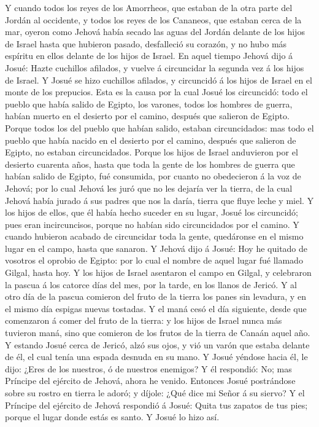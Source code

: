  Y cuando todos los reyes de los Amorrheos, que estaban de
la otra parte del Jordán al occidente, y todos los reyes de los
Cananeos, que estaban cerca de la mar, oyeron como Jehová había secado
las aguas del Jordán delante de los hijos de Israel hasta que hubieron
pasado, desfalleció su corazón, y no hubo más espíritu en ellos delante
de los hijos de Israel.  En aquel tiempo Jehová dijo á
Josué: Hazte cuchillos afilados, y vuelve á circuncidar la segunda vez á
los hijos de Israel.  Y Josué se hizo cuchillos afilados, y
circuncidó á los hijos de Israel en el monte de los prepucios.
 Esta es la causa por la cual Josué los circuncidó: todo el
pueblo que había salido de Egipto, los varones, todos los hombres de
guerra, habían muerto en el desierto por el camino, después que salieron
de Egipto.  Porque todos los del pueblo que habían salido,
estaban circuncidados: mas todo el pueblo que había nacido en el
desierto por el camino, después que salieron de Egipto, no estaban
circuncidados.  Porque los hijos de Israel anduvieron por el
desierto cuarenta años, hasta que toda la gente de los hombres de guerra
que habían salido de Egipto, fué consumida, por cuanto no obedecieron á
la voz de Jehová; por lo cual Jehová les juró que no les dejaría ver la
tierra, de la cual Jehová había jurado á sus padres que nos la daría,
tierra que fluye leche y miel.  Y los hijos de ellos, que él
había hecho suceder en su lugar, Josué los circuncidó; pues eran
incircuncisos, porque no habían sido circuncidados por el camino.
 Y cuando hubieron acabado de circuncidar toda la gente,
quedáronse en el mismo lugar en el campo, hasta que sanaron.
 Y Jehová dijo á Josué: Hoy he quitado de vosotros el
oprobio de Egipto: por lo cual el nombre de aquel lugar fué llamado
Gilgal, hasta hoy.  Y los hijos de Israel asentaron el
campo en Gilgal, y celebraron la pascua á los catorce días del mes, por
la tarde, en los llanos de Jericó.  Y al otro día de la
pascua comieron del fruto de la tierra los panes sin levadura, y en el
mismo día espigas nuevas tostadas.  Y el maná cesó el día
siguiente, desde que comenzaron á comer del fruto de la tierra: y los
hijos de Israel nunca más tuvieron maná, sino que comieron de los frutos
de la tierra de Canaán aquel año.  Y estando Josué cerca de
Jericó, alzó sus ojos, y vió un varón que estaba delante de él, el cual
tenía una espada desnuda en su mano. Y Josué yéndose hacia él, le dijo:
¿Eres de los nuestros, ó de nuestros enemigos?  Y él
respondió: No; mas Príncipe del ejército de Jehová, ahora he venido.
Entonces Josué postrándose sobre su rostro en tierra le adoró; y díjole:
¿Qué dice mi Señor á su siervo?  Y el Príncipe del ejército
de Jehová respondió á Josué: Quita tus zapatos de tus pies; porque el
lugar donde estás es santo. Y Josué lo hizo así.

